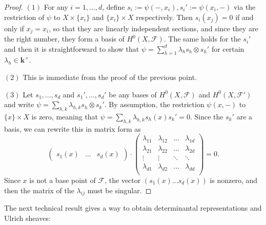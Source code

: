 \documentclass[12pt]{amsart}
\numberwithin{equation}{section}
\numberwithin{thmcounter}{section}
\theoremstyle{definition}
\theoremstyle{claim}
\newcommand{\kk}{\mathbf{k}}
\begin{document}
\begin{proof}
$(1)$ For any $i=1,\dots,d$, define $s_i := \psi(-,x_i), s_i' := \psi(x_i,-)$ via the restriction of $\psi$ to $X\times \{x_i\}$ and $\{x_i\}\times X$ respectively. Then $s_i(x_j) = 0$ if and only if $x_j=x_i$, so that they are linearly independent sections, and since they are the right number, they form a basis of $H^0(X,\mathscr{F})$. The same holds for the $s_i'$ and then it is straightforward to show that $\psi = \sum_{h=1}^d \lambda_h s_h\otimes s_h'$ for certain $\lambda_h\in \kk^{\times}$.

\medskip

\noindent $(2)$ This is immediate from the proof of the previous point.

\medskip

\noindent $(3)$ Let $s_1,\dots,s_d$ and $s_1',\dots,s_d'$ be any bases of $H^0(X,\mathscr{F})$ and $H^0(X,\mathscr{F}')$ and write $\psi = \sum_{h,k} \lambda_{h,k} s_h\otimes s_k'$. By assumption, the restriction $\psi(x,-)$ to $\{x\}\times X$ is zero, meaning that $\psi = \sum_{h,k} \lambda_{h,k} s_h(x) s_k' = 0$.  Since the $s_k'$ are a basis, we can rewrite this in matrix form as
		\[ \begin{pmatrix} s_1(x) & \dots & s_d(x) \end{pmatrix} \cdot \begin{pmatrix} \lambda_{11} & \lambda_{12} & \dots & \lambda_{1d} \\
			\lambda_{21} & \lambda_{22} & \dots & \lambda_{2d} \\
			\vdots & \vdots & \ddots & \ddots \\
			\lambda_{d1} & \lambda_{d2} & \dots & \lambda_{dd} \\
		\end{pmatrix} = 0. \]
		Since $x$ is not a base point of $\mathscr{F}$, the vector $(s_1(x)\dots s_d(x))$ is nonzero, and then the matrix of the $\lambda_{ij}$ must be singular.
\end{proof}


The next technical result gives a way to obtain determinantal representations and Ulrich sheaves:
\end{document}
